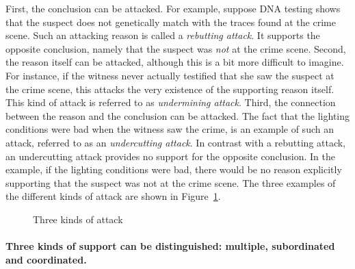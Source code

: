 \documentclass[10pt]{article}
\begin{document}
First, the conclusion can be attacked. %
For example, suppose DNA testing shows that the suspect does not genetically match 
with the traces found at the crime scene. 
Such an attacking reason is called a \textit{rebutting attack}. 
It supports the opposite conclusion, namely that the suspect was \textit{not} 
at the crime scene. 
%
Second, the reason itself can be attacked, although this is a bit more difficult to imagine. 
 For instance, %
 if the witness never actually testified that she saw the suspect at the crime scene, this attacks the very 
 existence of the supporting reason itself. 
 This kind of attack is referred to as \textit{undermining attack}. 
%
Third, the connection between the reason and the conclusion can be attacked.
 The fact that the lighting conditions were bad when the witness saw the crime, 
 is an example of such an attack, referred to as an \textit{undercutting attack}.
 In contrast with a rebutting attack, an undercutting attack provides no support for the opposite conclusion. In the example, %
 if the lighting conditions were bad, there would be no reason explicitly 
 supporting that the suspect was not at the crime scene. 
%
The three examples of the different kinds of attack are shown in Figure~\ref{fig:arg3}.

\begin{figure}[bt]
\centering

\caption{Three kinds of attack\label{fig:arg3}}
\end{figure}

\paragraph{Three kinds of support can be distinguished: multiple, subordinated and coordinated.}

\end{document}
